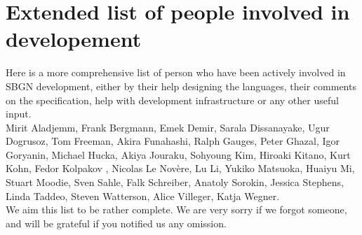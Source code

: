\chapter{Extended list of people involved in \SBGNAFLone developement}
\label{sec:af:acknowledgments}

Here is a more comprehensive list of person who have been actively involved in SBGN development, either by their help designing the languages, their comments on the specification, help with development infrastructure or any other useful input.\\[\baselineskip]

Mirit Aladjemm, Frank Bergmann, Emek Demir, Sarala Dissanayake, Ugur Dogrusoz, Tom Freeman, Akira Funahashi, Ralph Gauges, Peter Ghazal, Igor Goryanin, Michael Hucka, Akiya Jouraku, Sohyoung Kim, Hiroaki Kitano, Kurt Kohn, Fedor Kolpakov , Nicolas Le Nov\`{e}re, Lu Li, Yukiko Matsuoka, Huaiyu Mi, Stuart Moodie, Sven Sahle, Falk Schreiber, Anatoly Sorokin, Jessica Stephens, Linda Taddeo, Steven Watterson, Alice Villeger, Katja Wegner.\\[\baselineskip]

We aim this list to be rather complete. We are very sorry if we forgot someone, and will be grateful if you notified us any omission.
